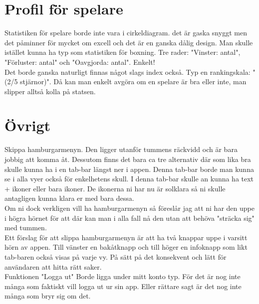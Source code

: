 \documentclass[11pt,a4paper]{article}
\begin{document}
\section{Profil för spelare}
Statistiken för spelare borde inte vara i cirkeldiagram. det är gaska snyggt men det påminner för mycket om excell och det är en ganska dålig design. Man skulle istället kunna ha typ som statistiken för boxning. Tre rader: "Vinster: antal", "Förluster: antal" och "Oavgjorda: antal". Enkelt!\\
Det borde ganska naturligt finnas något slags index också. Typ en rankingskala: "(2/5 stjärnor)". Då kan man enkelt avgöra om en spelare är bra eller inte, man slipper alltså kolla på statsen.

\section{Övrigt}
Skippa hamburgarmenyn. Den ligger utanför tummens räckvidd och är bara jobbig att komma åt. Dessutom finns det bara ca tre alternativ där som lika bra skulle kunna ha i en tab-bar längst ner i appen. Denna tab-bar borde man kunna se i alla vyer också för enkelhetens skull. I denna tab-bar skulle an kunna ha text + ikoner eller bara ikoner. De ikonerna ni har nu är solklara så ni skulle antagligen kunna klara er med bara dessa.\\
Om ni dock verkligen vill ha hamburgarmenyn så föreslår jag att ni har den uppe i högra hörnet för att där kan man i alla fall nå den utan att behöva "sträcka sig" med tummen.\\

Ett förslag för att slippa hamburgarmenyn är att ha två knappar uppe i varsitt hörn av appen. Till vänster en bakåtknapp och till höger en infoknapp som likt tab-baren också visas på varje vy. På sätt på det konsekvent och lätt för användaren att hitta rätt saker.\\

Funktionen "Logga ut" Borde ligga under mitt konto typ. För det är nog inte många som faktiskt vill logga ut ur sin app. Eller rättare sagt är det nog inte många som bryr sig om det.
\end{document}
